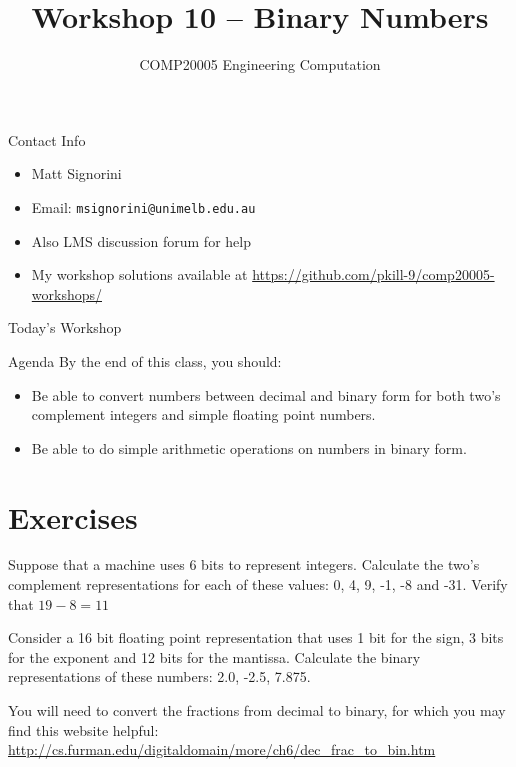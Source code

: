 \documentclass{beamer}
\title{Workshop 10 -- Binary Numbers}
\author{COMP20005 Engineering Computation}
\institute{The University of Melbourne}
\begin{document}
\renewcommand{\tt}[1]{\texttt{#1}}

\begin{frame}
    \titlepage
\end{frame}

\begin{frame}{Contact Info}
    \begin{itemize}
        \item Matt Signorini
        \item Email: \tt{msignorini@unimelb.edu.au}
        \item Also LMS discussion forum for help
        \item My workshop solutions available at \url{https://github.com/pkill-9/comp20005-workshops/}
    \end{itemize}
\end{frame}

\begin{frame}{Today's Workshop}
    \begin{block}{Agenda}
        By the end of this class, you should:
        \begin{itemize}
            \item Be able to convert numbers between decimal and binary
                form for both two's complement integers and simple 
                floating point numbers.
            \item Be able to do simple arithmetic operations on numbers
                in binary form.
        \end{itemize}
    \end{block}
\end{frame}

\section{Exercises}

\begin{frame}{13.1}
    Suppose that a machine uses 6 bits to represent integers. Calculate
    the two's complement representations for each of these values:
    0, 4, 9, -1, -8 and -31. Verify that $19 - 8 = 11$
\end{frame}

\begin{frame}{13.2}
    Consider a 16 bit floating point representation that uses 1 bit for 
    the sign, 3 bits for the exponent and 12 bits for the mantissa. 
    Calculate the binary representations of these numbers: 2.0, -2.5, 
    7.875.

    You will need to convert the fractions from decimal to binary, for
    which you may find this website helpful: 
    \url{http://cs.furman.edu/digitaldomain/more/ch6/dec\_frac\_to\_bin.htm}
\end{frame}
\end{document}
